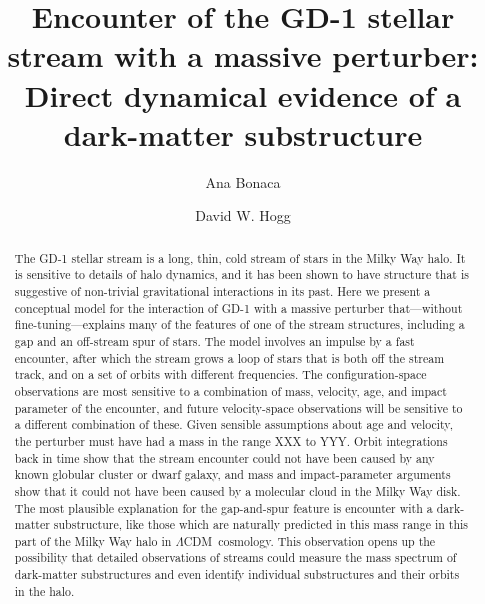 \documentclass[12pt, modern]{aastex62}
\newcommand{\acronym}[1]{{\small{#1}}}
\newcommand{\lcdm}{\acronym{$\Lambda$CDM}}
\begin{document}
\sloppy\sloppypar\raggedbottom\frenchspacing

\title{\textbf{%
Encounter of the GD-1 stellar stream with a massive perturber:\\
Direct dynamical evidence of a dark-matter substructure
}}


\author[0000-0002-7846-9787]{Ana Bonaca}

\author[0000-0003-2866-9403]{David W. Hogg}

\begin{abstract}\noindent
The GD-1 stellar stream is a long, thin, cold stream of stars in the
Milky Way halo.
It is sensitive to details of halo dynamics, and it has been shown to
have structure that is suggestive of non-trivial gravitational
interactions in its past.
Here we present a conceptual model for the interaction of GD-1 with a
massive perturber that---without fine-tuning---explains many of the features of one of the
stream structures, including a gap and an off-stream spur of stars.
The model involves an impulse by a fast encounter, after which the
stream grows a loop of stars that is both off the stream track, and on
a set of orbits with different frequencies.
The configuration-space observations are most sensitive to a
combination of mass, velocity, age, and impact parameter of the
encounter, and future velocity-space observations will be sensitive to a
different combination of these.
Given sensible assumptions about age and velocity, the perturber
must have had a mass in the range XXX to YYY.
Orbit integrations back in time show that the stream encounter could not
have been caused by any known globular cluster or dwarf galaxy, and
mass and impact-parameter arguments show that it could not have been caused
by a molecular cloud in the Milky Way disk.
The most plausible explanation for the gap-and-spur feature is
encounter with a dark-matter substructure, like those which are
naturally predicted in this mass range in this part of the Milky Way
halo in \lcdm\ cosmology.
This observation opens up the possibility that detailed observations of streams
could measure the mass spectrum of dark-matter substructures and even identify
individual substructures and their orbits in the halo.
\end{abstract}
\end{document}
